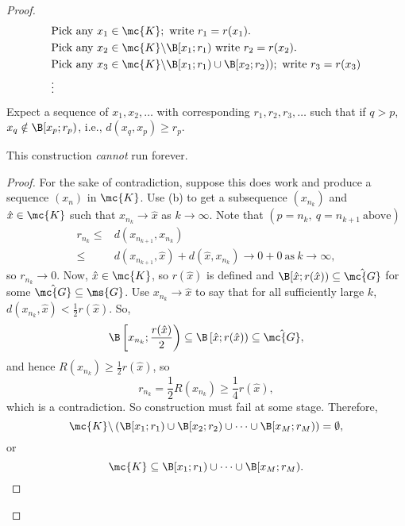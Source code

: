 \begin{proof}
	\begin{align*}
		&\text{Pick any}~x_1\in\mc{K};~\text{write}~r_1=r(x_1).\\
		&\text{Pick any}~x_2\in\mc{K}\backslash\B[x_1;r_1)~\text{write}~r_2=r(x_2).\\
		&\text{Pick any}~x_3\in\mc{K}\backslash\B[x_1;r_1)\cup\B[x_2;r_2));~\text{write}~r_3=r(x_3)\\
		&\vdots
	\end{align*}
	Expect a sequence of \(x_1,x_2,\dots\) with corresponding \(r_1,r_2,r_3,\dots\) such that if \(q>p\), \(x_q\notin\B[x_p;r_p)\), i.e., \(d(x_q,x_p)\geq r_p\).
	\begin{claim}
		This construction \emph{cannot} run forever.
	\end{claim}
	\begin{proof}
		For the sake of contradiction, suppose this does work and produce a sequence \((x_n)\) in \(\mc{K}\). Use (b) to get a subsequence \((x_{n_k})\) and \(\hat{x}\in\mc{K}\) such that \(x_{n_k}\to\hat{x}\) as \(k\to\infty\). Note that \((p=n_k,~q=n_{k+1}~\text{above})\)
		\begin{align*}
			r_{n_k}\leq&d(x_{n_{k+1}},x_{n_{k}})\\
				   \leq&d(x_{n_{k+1}},\hat{x})+d(\hat{x},x_{n_k})\to 0+0~\text{as}~k\to\infty,
		\end{align*}
		so \(r_{n_k}\to 0\). Now, \(\hat{x}\in\mc{K}\), so \(r(\hat{x})\) is defined and \(\B[\hat{x};r(\hat{x}))\subseteq\hat{\mc{G}}\) for some \(\hat{\mc{G}}\subseteq\ms{G}\). Use \(x_{n_k}\to\hat{x}\) to say that for all sufficiently large \(k\), \(d(x_{n_k},\hat{x})<\displaystyle\frac{1}{2}r(\hat{x})\). So, 
		\begin{equation*}
			\B\left[x_{n_k};\frac{r(\hat{x})}{2}\right)\subseteq \B\left[\hat{x};r(\hat{x})\right)\subseteq\hat{\mc{G}},
		\end{equation*} 
		and hence \(R(x_{n_k})\geq\displaystyle\frac{1}{2}r(\hat{x})\), so 
		\begin{equation*}
			r_{n_k}=\frac{1}{2}R(x_{n_k})\geq\frac{1}{4}r(\hat{x}),
		\end{equation*}
		which is a contradiction. So construction must fail at some stage. Therefore,
		\begin{equation*}
			\mc{K}\backslash\left(\B[x_1;r_1)\cup\B[x_2;r_2)\cup\dots\cup\B[x_M;r_M)\right)=\emptyset,
		\end{equation*} 
		or
		\begin{equation*}
			\mc{K}\subseteq\B[x_1;r_1)\cup\dots\cup\B[x_M;r_M).
		\end{equation*}

\end{proof}
\end{proof}
